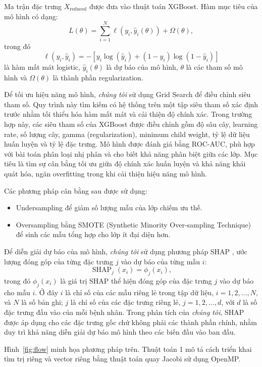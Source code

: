 Ma trận đặc trưng $X_{\text{reduced}}$ được đưa vào thuật toán XGBoost. Hàm mục tiêu của mô hình có dạng:
\[
L(\theta)=\sum_{i=1}^{N}\ell\left(y_i,\hat y_i(\theta)\right)+\Omega(\theta),
\]
trong đó
\[
\ell(y_i,\hat y_i)=-\left[y_i\log(\hat y_i)+(1-y_i)\log(1-\hat y_i)\right]
\]
là hàm mất mát logistic, $\hat y_i(\theta)$ là dự báo của mô hình, $\theta$ là các tham số mô hình và $\Omega(\theta)$ là thành phần regularization.

Để tối ưu hiệu năng mô hình, \textit{chúng tôi} sử dụng Grid Search để điều chỉnh siêu tham số. Quy trình này tìm kiếm có hệ thống trên một tập siêu tham số xác định trước nhằm tối thiểu hóa hàm mất mát và cải thiện độ chính xác. Trong trường hợp này, các siêu tham số của XGBoost được điều chỉnh gồm độ sâu cây, learning rate, số lượng cây, gamma (regularization), minimum child weight, tỷ lệ dữ liệu huấn luyện và tỷ lệ đặc trưng. Mô hình được đánh giá bằng ROC-AUC, phù hợp với bài toán phân loại nhị phân và cho biết khả năng phân biệt giữa các lớp. Mục tiêu là tìm sự cân bằng tối ưu giữa độ chính xác huấn luyện và khả năng khái quát hóa, ngăn overfitting trong khi cải thiện hiệu năng mô hình.

Các phương pháp cân bằng sau được sử dụng:
\begin{itemize}
  \item Undersampling để giảm số lượng mẫu của lớp chiếm ưu thế.
  \item Oversampling bằng SMOTE (Synthetic Minority Over-sampling Technique)  để sinh các mẫu tổng hợp cho lớp ít đại diện hơn.
\end{itemize}

Để diễn giải dự báo của mô hình, \textit{chúng tôi} sử dụng phương pháp SHAP , ước lượng đóng góp của từng đặc trưng $j$ vào dự báo của từng mẫu $i$:
\[
\operatorname{SHAP}_{j}(x_i)=\phi_j(x_i),
\]
trong đó $\phi_j(x_i)$ là giá trị SHAP thể hiện đóng góp của đặc trưng $j$ vào dự báo cho mẫu $i$. Ở đây $i$ là chỉ số của các mẫu riêng lẻ trong tập dữ liệu, $i=1,2,\ldots,N$, và $N$ là số bản ghi; $j$ là chỉ số của các đặc trưng riêng lẻ, $j=1,2,\ldots,d$, với $d$ là số đặc trưng đầu vào của mỗi bệnh nhân. Trong phân tích của \textit{chúng tôi}, SHAP được áp dụng cho các đặc trưng gốc chứ không phải các thành phần chính, nhằm duy trì khả năng diễn giải dự báo mô hình theo các biến đầu vào ban đầu.

Hình~\ref{fig:flow} minh họa phương pháp trên. Thuật toán 1 mô tả cách triển khai tìm trị riêng và vector riêng bằng thuật toán quay Jacobi sử dụng OpenMP.

